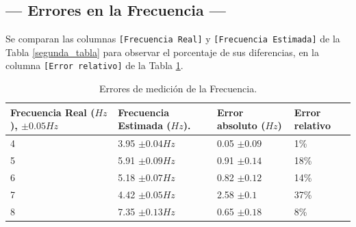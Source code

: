 \documentclass[12pt,a4paper]{article}
\begin{document}
\subsection{--- Errores en la Frecuencia ---} %
\label{sub:errores}
Se comparan las columnas \texttt{[Frecuencia Real]} y \texttt{[Frecuencia Estimada]} de la Tabla \ref{segunda_tabla} para observar el porcentaje de sus diferencias, en la columna \texttt{[Error relativo]} de la Tabla \ref{tercer_tabla}.
\begin{table}[ht]
	\centering
	\caption{Errores de medición de la Frecuencia.}
	\begin{tabular}{|p{3cm} |p{3.5cm} |p{2.5cm} |p{2.5cm}|}
		\hline 
		Frecuencia Real (\(Hz\)), \(\pm 0.05Hz\) & Frecuencia Estimada (\(Hz\)). & Error absoluto (\(Hz\)) & Error relativo \\ \hline
		4 & 3.95 \(\pm 0.04Hz\) & 0.05 \(\pm 0.09\) &1\textsc{\%}\\ \hline
		5 & 5.91 \(\pm 0.09Hz\) & 0.91 \(\pm 0.14\) &18\textsc{\%}\\ \hline
		6 & 5.18 \(\pm 0.07Hz\) & 0.82 \(\pm 0.12\) &14\textsc{\%}\\ \hline
		7 & 4.42 \(\pm 0.05Hz\) & 2.58 \(\pm 0.1\) &37\textsc{\%}\\ \hline
		8 & 7.35 \(\pm 0.13Hz\) & 0.65 \(\pm 0.18\) &8\textsc{\%}\\ \hline
	\end{tabular}
	\label{tercer_tabla}
\end{table}

\end{document}
